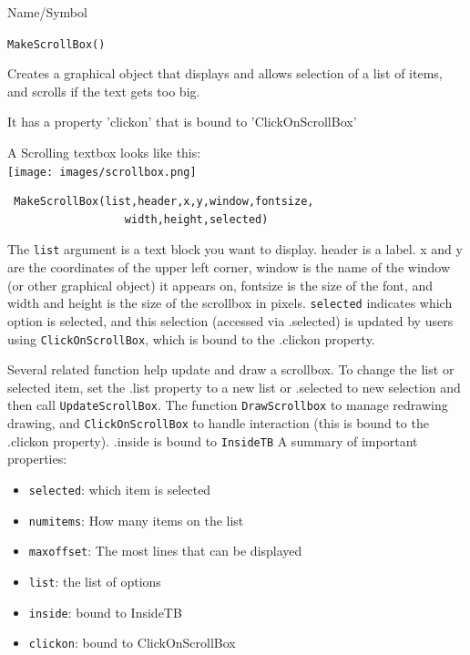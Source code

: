 \begin{desc}{Name/Symbol}
\item[Name/Symbol]  	\verb+MakeScrollBox()+

\item[Description]	
Creates a graphical object that displays and allows selection of a list of items, and scrolls if the text gets too big. 

It has a property 'clickon' that is bound to 'ClickOnScrollBox'

A Scrolling textbox looks like this:\\
 \texttt{[image: images/scrollbox.png]}

\item[Usage]
\begin{verbatim}
 MakeScrollBox(list,header,x,y,window,fontsize,
                  width,height,selected)
 \end{verbatim}

The \texttt{list} argument is a text block you want to display. header is a label. x and y are the coordinates of the upper left corner, window is the name of the window (or other graphical object) it appears on, fontsize is the size of the font, and width and height is the size of the scrollbox in pixels. \verb+selected+ indicates which option is selected, and this selection  (accessed via .selected) is updated by users using \verb+ClickOnScrollBox+, which is bound to the .clickon property.  


Several related function help update and draw a scrollbox.  To change the list or selected item, set the .list property to a new list or .selected to new selection and then call \verb+UpdateScrollBox+.  The function \verb+DrawScrollbox+ to manage redrawing drawing, and \verb+ClickOnScrollBox+ to handle interaction (this is bound to the .clickon property). .inside is bound to \verb+InsideTB+
A summary of important properties:
\begin{itemize}
\item \verb+selected+: which item is selected
\item \verb+numitems+: How many items on the list
\item \verb+maxoffset+: The most lines that can be displayed
\item \verb+list+: the list of options 
\item \verb+inside+: bound to InsideTB
\item \verb+clickon+: bound to ClickOnScrollBox

\end{itemize}



\end{desc}

